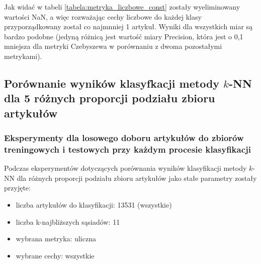 \documentclass{classrep}
\begin{document}
Jak widać w tabeli \ref{tabela:metryka_liczbowe_const} zostały wyeliminowany wartości NaN, a więc rozważając cechy liczbowe do każdej klasy przyporządkowany został co najmnniej 1 artykuł. Wyniki dla wszystkich miar są bardzo podobne (jedyną różnicą jest wartość miary Precision, która jest o 0,1 mniejsza dla metryki Czebyszewa w porównaniu z dwoma pozostałymi metrykami).

\subsection{Porównanie wyników klasyfkacji metody $k$-NN dla 5 różnych proporcji podziału zbioru artykułów}
\subsubsection{Eksperymenty dla losowego doboru artykułów do zbiorów treningowych i testowych przy każdym procesie klasyfikacji}
Podczas eksperymentów dotyczących porównania wyników klasyfikacji metody $k$-NN dla różnych proporcji podziału zbioru artykułów jako stałe parametry zostały przyjęte:
\begin{itemize}
    \item liczba artykułów do klasyfikacji: 13531 (wszystkie)
    \item liczba k-najbliższych sąsiadów: 11 
    \item wybrana metryka: uliczna
    \item wybrane cechy: wszystkie
\end{itemize}
\end{document}
